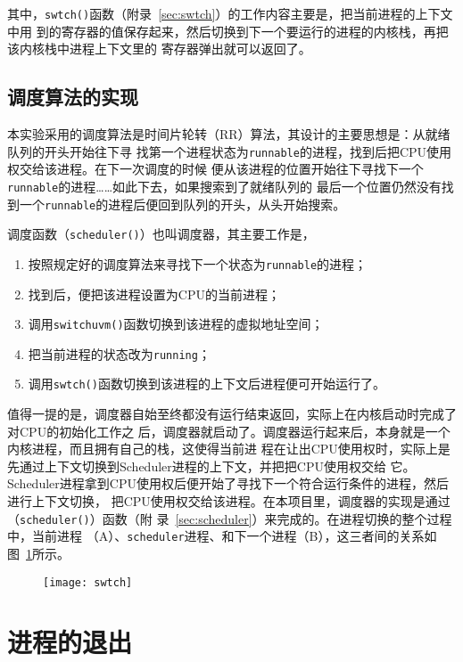\documentclass{swfcthesismscctex}
\begin{document}
其中，\texttt{swtch()}函数（附录~\ref{sec:swtch}）的工作内容主要是，把当前进程的上下文中用
到的寄存器的值保存起来，然后切换到下一个要运行的进程的内核栈，再把该内核栈中进程上下文里的
寄存器弹出就可以返回了。

\subsection{调度算法的实现}

本实验采用的调度算法是时间片轮转（RR）算法，其设计的主要思想是：从就绪队列的开头开始往下寻
找第一个进程状态为\texttt{runnable}的进程，找到后把CPU使用权交给该进程。在下一次调度的时候
便从该进程的位置开始往下寻找下一个\texttt{runnable}的进程……如此下去，如果搜索到了就绪队列的
最后一个位置仍然没有找到一个\texttt{runnable}的进程后便回到队列的开头，从头开始搜索。

调度函数（\texttt{scheduler()}）也叫调度器，其主要工作是，
\begin{enumerate}
\item 按照规定好的调度算法来寻找下一个状态为\texttt{runnable}的进程；
\item 找到后，便把该进程设置为CPU的当前进程；
\item 调用\texttt{switchuvm()}函数切换到该进程的虚拟地址空间；
\item 把当前进程的状态改为\texttt{running}；
\item 调用\texttt{swtch()}函数切换到该进程的上下文后进程便可开始运行了。
\end{enumerate}
值得一提的是，调度器自始至终都没有运行结束返回，实际上在内核启动时完成了对CPU的初始化工作之
后，调度器就启动了。调度器运行起来后，本身就是一个内核进程，而且拥有自己的栈，这使得当前进
程在让出CPU使用权时，实际上是先通过上下文切换到Scheduler进程的上下文，并把把CPU使用权交给
它。Scheduler进程拿到CPU使用权后便开始了寻找下一个符合运行条件的进程，然后进行上下文切换，
把CPU使用权交给该进程。在本项目里，调度器的实现是通过（\texttt{scheduler()}）函数（附
录~\ref{sec:scheduler}）来完成的。在进程切换的整个过程中，当前进程
（A）、\texttt{scheduler}进程、和下一个进程（B），这三者间的关系如图~\ref{fig:swtch}所示。

\begin{figure}[ht]
  \centering
  \texttt{[image: swtch]}
  \label{fig:swtch}
\end{figure}

\section{进程的退出}
\end{document}
